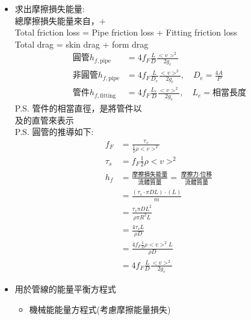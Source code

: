 \documentclass[../main.tex]{subfiles}
\begin{document}
\begin{itemize}
\begin{itemize}
    \item 摩擦損失速度: Velocity loss，($v_f,~[=]~(m/s)$)\\
    將摩擦損失能量當成動能，所換算出的速度
    \begin{equation}
      \frac{1}{2g_c}mv^2 \implies \boxed{h_f = \frac{v_f^2}{2g_c}}
    \end{equation}
  \end{itemize}
  \item 求出摩擦損失能量:\\
  總摩擦損失能量來自，+\\
  Total friction loss = Pipe friction loss + Fitting friction loss\\
  Total drag = skin drag + form drag
  \begin{align}
    \text{圓管} h_{f,\text{pipe}} &= 4 f_F\frac{L}{D}\frac{<v>^2}{2g_c} \\
    \text{非圓管} h_{f,\text{pipe}} &= 4f_F \frac{L}{D_e} \frac{<v>^2}{2g_c},\quad D_e = \frac{4A}{P} \\
    \text{管件} h_{f,\text{fitting}} &= 4f_F \frac{L_e}{D} \frac{<v>^2}{2g_c}, \quad L_e = \text{相當長度}
  \end{align}
  P.S. 管件的相當直徑，是將管件以\\
  及的直管來表示\\
  P.S. 圓管的推導如下:
  \begin{align}
    f_F &= \frac{\tau_s}{\frac{1}{2}\rho <v>^2} \nonumber\\
    \tau_s &= f_F \frac{1}{2}\rho <v>^2 \nonumber\\
    h_f &= \frac{\text{摩擦損失能量}}{\text{流體質量}} = \frac{\text{摩擦力}\cdot \text{位移}}{\text{流體質量}} \nonumber\\
    &= \frac{(\tau_s \cdot \pi DL)\cdot (L)}{m} \nonumber\\
    &= \frac{\tau_s \pi DL^2}{\rho \pi R^2 L} \nonumber\\
    &= \frac{4\tau_s L}{\rho D} \nonumber\\
    &= \frac{4 f_F \frac{1}{2}\rho <v>^2 L}{\rho D} \nonumber\\
    &= 4 f_F \frac{L}{D} \frac{<v>^2}{2g_c}
  \end{align}
  \item 用於管線的能量平衡方程式
  \begin{itemize}
    \item 機械能能量方程式(考慮摩擦能量損失)
    \begin{equation}

\end{equation}
\end{itemize}
\end{itemize}
\end{document}
